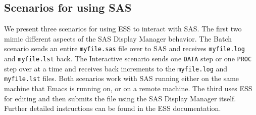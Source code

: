 \documentclass{article}
\newcommand*{\Splus}{\textsc{S-Plus}}
\newcommand{\stexttt}[1]{{\small\texttt{#1}}}
\newcommand{\elcode}[1]{\\{\stexttt{\hspace*{2em} #1}}\\}
\begin{document}




\subsection{Scenarios for using SAS}
\label{sec:SAS:scen}

We present three scenarios for using ESS to interact with SAS.  The
first two mimic different aspects of the SAS Display Manager behavior.
The Batch scenario sends an entire
\stexttt{myfile.sas} file over to SAS and receives
\stexttt{myfile.log} and \stexttt{myfile.lst} back.  The Interactive
scenario sends one \stexttt{DATA} step or one \stexttt{PROC} step over
at a time and receives back increments to the \stexttt{myfile.log} and
\stexttt{myfile.lst} files.  Both scenarios work with SAS running
either on the same machine that Emacs is running on, or on a remote
machine.  The third uses ESS for editing and then submits the file using the SAS
Display Manager itself.  Further detailed instructions can be found in the ESS
documentation.
\end{document}
